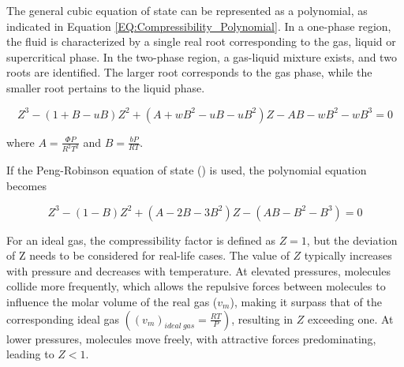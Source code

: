 \documentclass[../Article_Model_Parameters.tex]{subfiles}
\begin{document}
	\begin{table}[h!]
		\centering
		\caption{Parameters for Popular Cubic EoS.}
		\label{tab:Popular_Cubic_EoS_alpha}
	\end{table}
	
	The general cubic equation of state can be represented as a polynomial, as indicated in Equation \ref{EQ:Compressibility_Polynomial}. In a one-phase region, the fluid is characterized by a single real root corresponding to the gas, liquid or supercritical phase. In the two-phase region, a gas-liquid mixture exists, and two roots are identified. The larger root corresponds to the gas phase, while the smaller root pertains to the liquid phase.
	
	{\footnotesize
		\begin{equation}
			\label{EQ:Compressibility_Polynomial}
			Z^3 - (1+B-uB)Z^2+(A+wB^2-uB-uB^2)Z - AB - wB^2 - wB^3 = 0
	\end{equation} }
	
	where $A=\frac{\Phi P}{R^2T^2}$ and $B=\frac{bP}{RT}$.
	
	If the Peng-Robinson equation of state (\citet{Peng1976}) is used, the polynomial equation becomes
	
	{\footnotesize
		\begin{equation}
			\label{EQ:Peng_Robinson_Polynomial}
			Z^3 - (1-B)Z^2+(A-2B-3B^2)Z -(AB-B^2-B^3) = 0
	\end{equation} }
	
	For an ideal gas, the compressibility factor is defined as $Z = 1$, but the deviation of Z needs to be considered for real-life cases. The value of $Z$ typically increases with pressure and decreases with temperature. At elevated pressures, molecules collide more frequently, which allows the repulsive forces between molecules to influence the molar volume of the real gas ($v_m$), making it surpass that of the corresponding ideal gas $\left( \left(v_m\right)_{ideal~gas} = \frac{RT}{P} \right)$, resulting in $Z$ exceeding one. At lower pressures, molecules move freely, with attractive forces predominating, leading to $Z < 1$.
	
\end{document}
